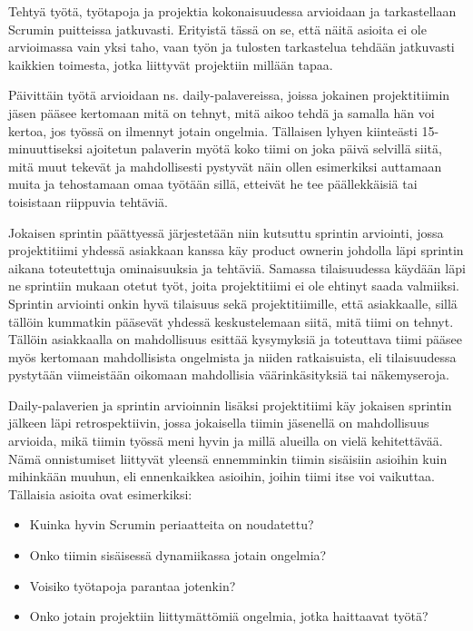 \documentclass[finnish,nonumbib,nocopyright]{gradu2}
\begin{document}
Tehtyä työtä, työtapoja ja projektia kokonaisuudessa arvioidaan ja tarkastellaan Scrumin puitteissa jatkuvasti. Erityistä tässä on se, että näitä asioita ei ole arvioimassa vain yksi taho, vaan työn ja tulosten tarkastelua tehdään jatkuvasti kaikkien toimesta, jotka liittyvät projektiin millään tapaa.

Päivittäin työtä arvioidaan ns. daily-palavereissa, joissa jokainen projektitiimin jäsen pääsee kertomaan mitä on tehnyt, mitä aikoo tehdä ja samalla hän voi kertoa, jos työssä on ilmennyt jotain ongelmia. Tällaisen lyhyen kiinteästi 15-minuuttiseksi ajoitetun palaverin myötä koko tiimi on joka päivä selvillä siitä, mitä muut tekevät ja mahdollisesti pystyvät näin ollen esimerkiksi auttamaan muita ja tehostamaan omaa työtään sillä, etteivät he tee päällekkäisiä tai toisistaan riippuvia tehtäviä.

Jokaisen sprintin päättyessä järjestetään niin kutsuttu sprintin arviointi, jossa projektitiimi yhdessä asiakkaan kanssa käy product ownerin johdolla läpi sprintin aikana toteutettuja ominaisuuksia ja tehtäviä. Samassa tilaisuudessa käydään läpi ne sprintiin mukaan otetut työt, joita projektitiimi ei ole ehtinyt saada valmiiksi. Sprintin arviointi onkin hyvä tilaisuus sekä projektitiimille, että asiakkaalle, sillä tällöin kummatkin pääsevät yhdessä keskustelemaan siitä, mitä tiimi on tehnyt. Tällöin asiakkaalla on mahdollisuus esittää kysymyksiä ja toteuttava tiimi pääsee myös kertomaan mahdollisista ongelmista ja niiden ratkaisuista, eli tilaisuudessa pystytään viimeistään oikomaan mahdollisia väärinkäsityksiä tai näkemyseroja.

Daily-palaverien ja sprintin arvioinnin lisäksi projektitiimi käy jokaisen sprintin jälkeen läpi retrospektiivin, jossa jokaisella tiimin jäsenellä on mahdollisuus arvioida, mikä tiimin työssä meni hyvin ja millä alueilla on vielä kehitettävää. Nämä onnistumiset liittyvät yleensä ennemminkin tiimin sisäisiin asioihin kuin mihinkään muuhun, eli ennenkaikkea asioihin, joihin tiimi itse voi vaikuttaa. Tällaisia asioita ovat esimerkiksi:
\begin{itemize}
\item Kuinka hyvin Scrumin periaatteita on noudatettu?
\item Onko tiimin sisäisessä dynamiikassa jotain ongelmia?
\item Voisiko työtapoja parantaa jotenkin?
\item Onko jotain projektiin liittymättömiä ongelmia, jotka haittaavat työtä?
\end{itemize}
\end{document}
